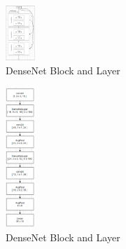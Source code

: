 \documentclass[conference]{IEEEtran}
\begin{document}
		\begin{figure}
			\centering
			\includegraphics[width=0.1\textwidth]{models/DenseNetLayer.png}
			\caption{DenseNet Block and Layer}
			\label{fig:densenet_layer}
		\end{figure}
	
		\begin{figure}
			\centering
			\includegraphics[width=0.1\textwidth]{models/DenseNetModel.png}
			\caption{DenseNet Block and Layer}
			\label{fig:dense_net_architecture}
		\end{figure}


		
		
	
\end{document}

